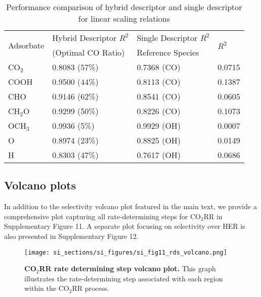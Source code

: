 \begin{table}[h]
  \centering
  {\fontsize{10}{12}\selectfont
  \begin{tabular}{*{4}{l}}
    \hline
    \multirow{2}{*}{Adsorbate} & Hybrid Descriptor $R^2$ & Single Descriptor $R^2$ & \multirow{2}{*}{$R^2$} \\
                               & (Optimal CO Ratio)      & Reference Species       &                        \\
    \hline
    CO$_2$    & 0.8083 (57\%)  & 0.7368 (CO)  & 0.0715 \\
    COOH      & 0.9500 (44\%)  & 0.8113 (CO)  & 0.1387 \\
    CHO       & 0.9146 (62\%)  & 0.8541 (CO)  & 0.0605 \\
    CH$_2$O   & 0.9299 (50\%)  & 0.8226 (CO)  & 0.1073 \\
    OCH$_3$   & 0.9936 (5\%)   & 0.9929 (OH)  & 0.0007 \\
    O         & 0.8974 (23\%)  & 0.8825 (OH)  & 0.0149 \\
    H         & 0.8303 (47\%)  & 0.7617 (OH)  & 0.0686 \\
    \hline
  \end{tabular}
  }
  \caption{Performance comparison of hybrid descriptor and single descriptor for linear scaling relations}
  \label{si_table14}
\end{table}


\subsection{Volcano plots}


In addition to the selectivity volcano plot featured in the main text, we provide a comprehensive plot capturing all rate-determining steps for CO$_2$RR in Supplementary Figure 11. A separate plot focusing on selectivity over HER is also presented in Supplementary Figure 12.


\begin{figure}
  \centering
  \texttt{[image: si\_sections/si\_figures/si\_fig11\_rds\_volcano.png]}
  \caption{\textbf{CO$_2$RR rate determining step volcano plot.}
  This graph illustrates the rate-determining step associated with each region within the CO$_2$RR process.}
  \label{si_fig11:rds_volcano}
\end{figure}


